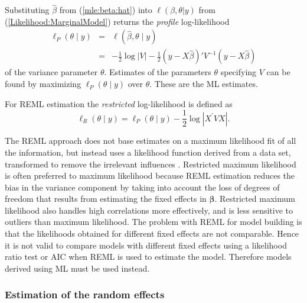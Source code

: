 \documentclass[MAIN.tex]{subfiles}
\begin{document}
Substituting $\hat{\beta}$ from (\ref{mle:beta:hat}) into $\ell(\beta, \theta|y)$ from (\ref{Likelihood:MarginalModel}) returns the \emph{profile} log-likelihood
\begin{eqnarray*}
	\ell_P(\theta \mid y) &=& \ell(\hat{\beta}, \theta \mid y) \\
	&=& -\frac{1}{2} \log |V| -\frac{1}{2}(y - X \hat{\beta})'V^{-1}(y - X \hat{\beta})
\end{eqnarray*}
of the variance parameter $\theta.$ Estimates of the parameters $\theta$ specifying $V$ can be found by maximizing $\ell_P(\theta \mid y)$ over $\theta.$ These are the ML estimates.

For REML estimation the \emph{restricted} log-likelihood is defined as
\[
\ell_R(\theta \mid y) =
\ell_P(\theta \mid y) -\frac{1}{2} \log |X^\prime VX |.
\]

The REML approach does not base estimates on a maximum likelihood fit of all the information, but instead uses a likelihood function derived from a data set, transformed to remove the irrelevant influences \citep{REMLDefine}.
Restricted maximum likelihood is often preferred to maximum likelihood because REML estimation reduces the bias in the variance component by taking into account the loss of degrees of freedom that results
from estimating the fixed effects in $\boldsymbol{\beta}$. Restricted maximum likelihood also handles high correlations more effectively, and is less sensitive to outliers than maximum likelihood.  The problem with REML for model building is that the likelihoods obtained for different fixed effects are not comparable. Hence it is not valid to compare models with different fixed effects using a likelihood ratio test or AIC when REML is used to
estimate the model. Therefore models derived using ML must be used instead.

\subsubsection{Estimation of the random effects}
\end{document}
